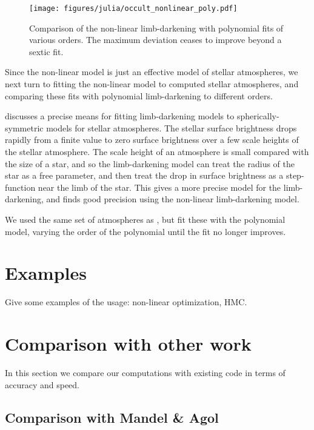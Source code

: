 \documentclass[modern]{aastex61}
\begin{document}
\begin{figure}
    \begin{centering}
    \texttt{[image: figures/julia/occult\_nonlinear\_poly.pdf]}
    \caption{Comparison of the non-linear limb-darkening with polynomial
    fits of various orders.  The maximum deviation ceases to improve
    beyond a sextic fit.}
    \label{fig:nonlinear}
    \end{centering} 
\end{figure}

Since the non-linear model is just an effective model of stellar
atmospheres, we next turn to fitting the non-linear model to
computed stellar atmospheres, and comparing these fits with
polynomial limb-darkening to different orders.

\citet{Claret2018} discusses a precise means for fitting limb-darkening
models to spherically-symmetric models for stellar atmospheres.  The
stellar surface brightness drops rapidly from a finite value to zero surface
brightness over a few scale heights of the stellar atmosphere.
The scale height of an atmosphere is small compared with the size of a star,
and so the limb-darkening model can treat the radius of the star as a
free parameter, and then treat the drop in surface brightness as a step-
function near the limb of the star.  This gives a more precise model
for the limb-darkening, and \citet{Claret2018} finds good precision
using the non-linear limb-darkening model.

We used the same set of atmospheres as \citet{Claret2018}, but fit these
with the polynomial model, varying the order of the polynomial until the
fit no longer improves.

\section{Examples}

Give some examples of the usage: non-linear optimization, HMC.

\section{Comparison with other work} \label{sec:comparison}

In this section we compare our computations with existing code in terms
of accuracy and speed.

\subsection{Comparison with Mandel \& Agol}
\end{document}
